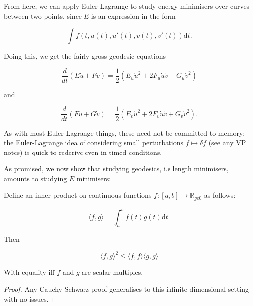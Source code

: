 \documentclass[11pt]{scrartcl}
\begin{document}
From here, we can apply Euler-Lagrange to study energy minimisers over curves between two points, since $E$ is an expression in the form

\begin{equation}
    \int f(t,u(t),u'(t),v(t),v'(t)) \mathrm{d}t.
\end{equation}

\begin{proposition}
Doing this, we get the fairly gross geodesic equations

\begin{equation}
    \frac{d}{dt}\left( E\dot{u} + F\dot{v} \right) = \frac12 \left( E_u \dot{u}^2 + 2F_u \dot{u}\dot{v} + G_u \dot{v}^2 \right)
\end{equation}

and 

\begin{equation}
    \frac{d}{dt}\left( F\dot{u} + G\dot{v} \right) = \frac12 \left( E_v \dot{u}^2 + 2F_v \dot{u}\dot{v} + G_v \dot{v}^2 \right).
\label{geod 2}
\end{equation}

\end{proposition}

\begin{remark}
As with most Euler-Lagrange things, these need not be committed to memory; the Euler-Lagrange idea of considering small perturbations $f \mapsto \delta f$ (see any VP notes) is quick to rederive even in timed conditions.
\end{remark}

As promised, we now show that studying geodesics, i.e length minimisers, amounts to studying $E$ minimisers:

\begin{proposition}

Define an inner product on continuous functions $f : [a, b] \rightarrow \mathbb{R}_{ge 0}$ as follows:

\begin{equation}
    \langle f, g \rangle = \int_a^b f(t) g(t) \mathrm{d}t.
\end{equation}

Then

\begin{equation}
    \langle f, g \rangle^2 \le \langle f,f \rangle \langle g,g \rangle
\end{equation}

With equality iff $f$ and $g$ are scalar multiples.

\begin{proof}
Any Cauchy-Schwarz proof generalises to this infinite dimensional setting with no issues.
\end{proof}
\end{proposition}
\end{document}
